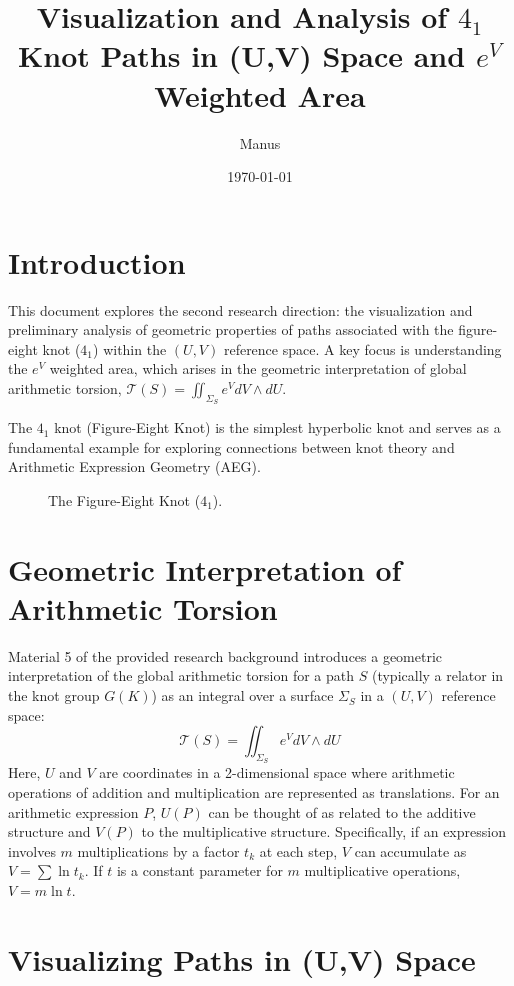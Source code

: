 \documentclass{article}
\title{Visualization and Analysis of $4_1$ Knot Paths in (U,V) Space and $e^V$ Weighted Area}
\author{Manus}
\date{\today}
\begin{document}
\maketitle

\section{Introduction}
This document explores the second research direction: the visualization and preliminary analysis of geometric properties of paths associated with the figure-eight knot ($4_1$) within the $(U,V)$ reference space. A key focus is understanding the $e^V$ weighted area, which arises in the geometric interpretation of global arithmetic torsion, $\mathcal{T}(S) = \iint_{\Sigma_S} e^V dV \wedge dU$.

The $4_1$ knot (Figure-Eight Knot) is the simplest hyperbolic knot and serves as a fundamental example for exploring connections between knot theory and Arithmetic Expression Geometry (AEG).

\begin{figure}[h!]
    \centering
    \caption{The Figure-Eight Knot ($4_1$).}
    \label{fig:knot_4_1_q2}
\end{figure}

\section{Geometric Interpretation of Arithmetic Torsion}
Material 5 of the provided research background introduces a geometric interpretation of the global arithmetic torsion for a path $S$ (typically a relator in the knot group $G(K)$) as an integral over a surface $\Sigma_S$ in a $(U,V)$ reference space:
\[
\mathcal{T}(S) = \iint_{\Sigma_S} e^V dV \wedge dU
\]
Here, $U$ and $V$ are coordinates in a 2-dimensional space where arithmetic operations of addition and multiplication are represented as translations. For an arithmetic expression $P$, $U(P)$ can be thought of as related to the additive structure and $V(P)$ to the multiplicative structure. Specifically, if an expression involves $m$ multiplications by a factor $t_k$ at each step, $V$ can accumulate as $V = \sum \ln t_k$. If $t$ is a constant parameter for $m$ multiplicative operations, $V = m \ln t$.

\section{Visualizing Paths in (U,V) Space}
\end{document}
